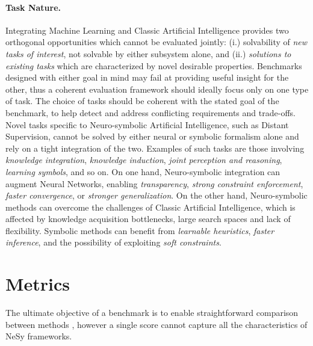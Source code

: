 \paragraph{Task Nature.} Integrating Machine Learning and Classic Artificial Intelligence provides two orthogonal opportunities which cannot be evaluated jointly: (i.) solvability of \textit{new tasks of interest}, not solvable by either subsystem alone, and (ii.) \textit{solutions to existing tasks} which are characterized by novel desirable properties.
Benchmarks designed with either goal in mind may fail at providing useful insight for the other, thus a coherent evaluation framework should ideally focus only on one type of task.
The choice of tasks should be coherent with the stated goal of the benchmark, to help detect and address conflicting requirements and trade-offs. %
%
Novel tasks specific to Neuro-symbolic Artificial Intelligence, such as Distant Supervision, cannot be solved by either neural or symbolic formalism alone and rely on a tight integration of the two. Examples of such tasks are those involving \textit{knowledge integration}, \textit{knowledge induction}, \textit{joint perception and reasoning}, \textit{learning symbols}, and so on.
On one hand, Neuro-symbolic integration can augment Neural Networks, enabling \textit{transparency}, \textit{strong constraint enforcement}, \textit{faster convergence}, or \textit{stronger generalization}.
On the other hand, Neuro-symbolic methods can overcome the challenges of Classic Artificial Intelligence, which is affected by knowledge acquisition bottlenecks, large search spaces and lack of flexibility. Symbolic methods can benefit from \textit{learnable heuristics}, \textit{faster inference}, and the possibility of exploiting \textit{soft constraints}.

\section{Metrics}
The ultimate objective of a benchmark is to enable straightforward comparison between methods%
, however a single score cannot capture all the characteristics of NeSy frameworks.%

